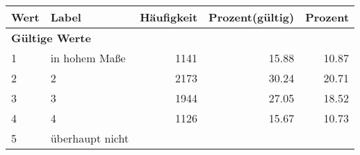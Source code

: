      \begin{longtable}{lXrrr}
     \toprule
     \textbf{Wert} & \textbf{Label} & \textbf{Häufigkeit} & \textbf{Prozent(gültig)} & \textbf{Prozent} \\
     \endhead
     \midrule
     \multicolumn{5}{l}{\textbf{Gültige Werte}}\\

     1 &
     \multicolumn{1}{X}{ in hohem Maße   } &


       \num{1141} &
       \num[round-mode=places,round-precision=2]{15,88} &
         \num[round-mode=places,round-precision=2]{10,87} \\

     2 &
     \multicolumn{1}{X}{ 2   } &


       \num{2173} &
       \num[round-mode=places,round-precision=2]{30,24} &
         \num[round-mode=places,round-precision=2]{20,71} \\

     3 &
     \multicolumn{1}{X}{ 3   } &


       \num{1944} &
       \num[round-mode=places,round-precision=2]{27,05} &
         \num[round-mode=places,round-precision=2]{18,52} \\

     4 &
     \multicolumn{1}{X}{ 4   } &


       \num{1126} &
       \num[round-mode=places,round-precision=2]{15,67} &
         \num[round-mode=places,round-precision=2]{10,73} \\

     5 &
     \multicolumn{1}{X}{ überhaupt nicht   } &



\end{longtable}
